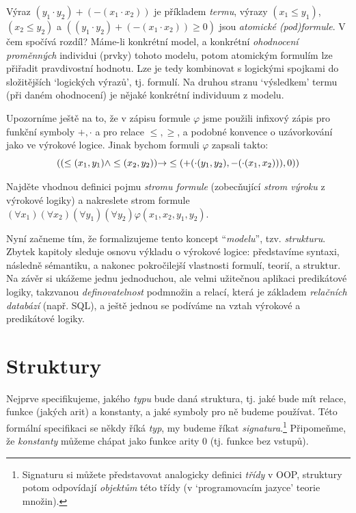 Výraz $(y_1 \cdot y_2)+(-(x_1\cdot x_2))$ je příkladem \emph{termu}, výrazy $(x_1\leq y_1)$, $(x_2\leq y_2)$ a $((y_1 \cdot y_2)+(-(x_1\cdot x_2))\geq 0)$ jsou \emph{atomické (pod)formule}. V čem spočívá rozdíl? Máme-li konkrétní model, a konkrétní \emph{ohodnocení proměnných} individui (prvky) tohoto modelu, potom atomickým formulím lze přiřadit pravdivostní hodnotu. Lze je tedy kombinovat s logickými spojkami do složitějších `logických výrazů', tj. formulí. Na druhou stranu `výsledkem' termu (při daném ohodnocení) je nějaké konkrétní individuum z modelu.

Upozorníme ještě na to, že v zápisu formule $\varphi$ jsme použili infixový zápis pro funkční symboly $+,\cdot$ a pro relace $\leq,\geq$, a podobné konvence o uzávorkování jako ve výrokové logice. Jinak bychom formuli $\varphi$ zapsali takto:
$$
((\leq (x_1,y_1) \land \leq(x_2,y_2))\mathbin{\rightarrow} \leq(+(\cdot (y_1,y_2),-(\cdot(x_1,x_2))),0))
$$


\begin{exercise}
Najděte vhodnou definici pojmu \emph{stromu formule} (zobecňující \emph{strom výroku} z výrokové logiky) a nakreslete strom formule $(\forall x_1)(\forall x_2)(\forall y_1)(\forall y_2)\varphi(x_1,x_2,y_1,y_2)$.
\end{exercise}


Nyní začneme tím, že formalizujeme tento koncept ``\emph{modelu}'', tzv. \emph{strukturu}. Zbytek kapitoly sleduje osnovu výkladu o výrokové logice: představíme syntaxi, následně sémantiku, a nakonec pokročilejší vlastnosti formulí, teorií, a struktur. Na závěr si ukážeme jednu jednoduchou, ale velmi užitečnou aplikaci predikátové logiky, takzvanou \emph{definovatelnost} podmnožin a relací, která je základem \emph{relačních databází} (např. SQL), a ještě jednou se podíváme na vztah výrokové a predikátové logiky.

\section{Struktury}

Nejprve specifikujeme, jakého \emph{typu} bude daná struktura, tj. jaké bude mít relace, funkce (jakých arit) a konstanty, a jaké symboly pro ně budeme používat. Této formální specifikaci se někdy říká \emph{typ}, my budeme říkat \emph{signatura}.\footnote{Signaturu si můžete představovat analogicky definici \emph{třídy} v OOP, struktury potom odpovídají \emph{objektům} této třídy (v `programovacím jazyce' teorie množin).} Připomeňme, že \emph{konstanty} můžeme chápat jako funkce arity 0 (tj. funkce bez vstupů).

